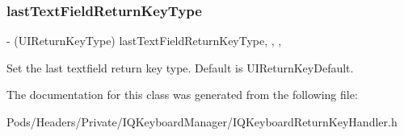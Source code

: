 \subsubsection{\texorpdfstring{last\+Text\+Field\+Return\+Key\+Type}{lastTextFieldReturnKeyType}}
{\footnotesize\ttfamily -\/ (U\+I\+Return\+Key\+Type) last\+Text\+Field\+Return\+Key\+Type\hspace{0.3cm}{\ttfamily [read]}, {\ttfamily [write]}, {\ttfamily [nonatomic]}, {\ttfamily [assign]}}

Set the last textfield return key type. Default is U\+I\+Return\+Key\+Default. 

The documentation for this class was generated from the following file\+:\begin{DoxyCompactItemize}
\item 
Pods/\+Headers/\+Private/\+I\+Q\+Keyboard\+Manager/I\+Q\+Keyboard\+Return\+Key\+Handler.\+h\end{DoxyCompactItemize}
